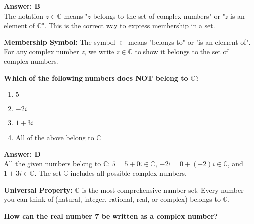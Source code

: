 \documentclass[12pt,a4paper]{article}
\begin{document}
\begin{answerstyle}
\textbf{Answer: B} \\
The notation \( z \in \mathbb{C} \) means "\( z \) belongs to the set of complex numbers" or "\( z \) is an element of \( \mathbb{C} \)". This is the correct way to express membership in a set.
\end{answerstyle}

\begin{conceptbox}
\textbf{Membership Symbol:} The symbol \( \in \) means "belongs to" or "is an element of". For any complex number \( z \), we write \( z \in \mathbb{C} \) to show it belongs to the set of complex numbers.
\end{conceptbox}

\newpage
\begin{questiontitle}[MCQ 13]
\textbf{Which of the following numbers does NOT belong to \( \mathbb{C} \)?}
\end{questiontitle}

\begin{partbox}[Options]
\begin{enumerate}[label=\Alph*.]
    \item \( 5 \)
    \item \( -2i \)
    \item \( 1 + 3i \)
    \item All of the above belong to \( \mathbb{C} \)
\end{enumerate}
\end{partbox}

\begin{answerstyle}
\textbf{Answer: D} \\
All the given numbers belong to \( \mathbb{C} \): \( 5 = 5 + 0i \in \mathbb{C} \), \( -2i = 0 + (-2)i \in \mathbb{C} \), and \( 1 + 3i \in \mathbb{C} \). The set \( \mathbb{C} \) includes all possible complex numbers.
\end{answerstyle}

\begin{conceptbox}
\textbf{Universal Property:} \( \mathbb{C} \) is the most comprehensive number set. Every number you can think of (natural, integer, rational, real, or complex) belongs to \( \mathbb{C} \).
\end{conceptbox}

\newpage
\begin{questiontitle}[MCQ 14]
\textbf{How can the real number 7 be written as a complex number?}
\end{questiontitle}
\end{document}
